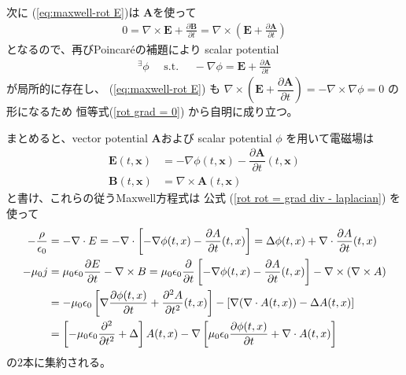 次に
(\ref{eq:maxwell-rot E})は
$\bm{A}$を使って
\begin{align}
  0 =
  \nabla \times \bm{E}
  +
  \frac{\partial \bm{B}}
    {\partial t}
=
  \nabla \times
  \left(
    \bm{E}
    +
    \frac{\partial \bm{A}}
      {\partial t}      
  \right)
\end{align}
となるので、再びPoincar\'eの補題により
scalar potential
\begin{align}
  {}^\exists \phi
\quad
\text{ s.t. }
\quad
  - \nabla \phi
=
  \bm{E}
  +
  \frac{\partial \bm{A}}
    {\partial t}
\end{align}
が局所的に存在し、
(\ref{eq:maxwell-rot E})
も
$\nabla \times
\left(
  \bm{E} +
  \dfrac{\partial \bm{A}}
    {\partial t}
\right)
= - \nabla \times \nabla \phi
= 0$
の形になるため
恒等式(\ref{rot grad = 0})
から自明に成り立つ。

まとめると、vector potential
$\bm{A}$および
scalar potential $\phi$
を用いて電磁場は
\begin{subequations}
\begin{align}
  \bm{E} (t, \bm{x})
&=
  - \nabla \phi (t, \bm{x})
  - \dfrac{\partial \bm{A}}
    {\partial t} (t, \bm{x})
\\
  \bm{B} (t, \bm{x})
&=
  \nabla \times
  \bm{A} (t, \bm{x})
\end{align}
\label{relation between potential and electric or magnetic field}
\end{subequations}
と書け、これらの従うMaxwell方程式は
公式
(\ref{rot rot = grad div - laplacian})
を使って
\begin{subequations}
\begin{align}
  - \frac{\rho}{\epsilon_0}
&=
  - \nabla \cdot E
=
  - \nabla \cdot
  \left[
    - \nabla \phi (t, x)
    - \dfrac{\partial A}
      {\partial t} (t, x)
  \right]
=
  \Delta \phi (t, x)
  +
    \nabla \cdot
    \dfrac{\partial A}
      {\partial t} (t, x)
\\
  - \mu_0 j
&=
  \mu_0 \epsilon_0
    \frac{\partial E}
      {\partial t}
  -
  \nabla \times B
=
  \mu_0 \epsilon_0
    \frac{\partial}{\partial t}
  \left[
    - \nabla \phi (t, x)
    - \dfrac{\partial A}
      {\partial t} (t, x)
  \right]
  -
  \nabla \times
    (\nabla \times A)
\notag\\&
=
  -
  \mu_0 \epsilon_0
  \left[
    \nabla
    \frac{\partial \phi (t, x)}
      {\partial t}
  +
    \dfrac{\partial^2 A}
      {\partial t^2} (t, x)
  \right]
  -
  \left[
    \nabla
      (\nabla \cdot A (t, x))
  -
    \Delta A (t, x)
  \right]
\notag\\&
=
  \left[
    - \mu_0 \epsilon_0
    \dfrac{\partial^2}{\partial t^2}
  +
    \Delta
  \right]
    A (t, x)
  -
  \nabla
  \left[
    \mu_0 \epsilon_0
    \frac{\partial \phi (t, x)}
      {\partial t}
  +
    \nabla \cdot
      A (t, x)
  \right]
\end{align}
\label{maxwell eq of potentials}
\end{subequations}
の$2$本に集約される。

